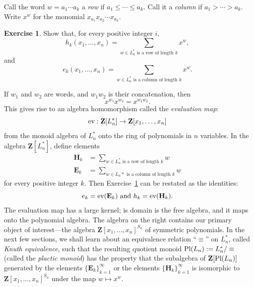 \documentclass[11pt]{amsproc}
\theoremstyle{definition}
\theoremstyle{example}
\newtheorem{exercise}[theorem]{Exercise}
\newcommand{\ev}{\textup{ev}}
\newcommand{\pl}{\textup{Pl}}
\begin{document}
Call the word $w=a_1\dotsb a_k$ a \emph{row} if $a_1\leq \dotsb \leq a_k$.
Call it a \emph{column} if $a_1>\dotsb>a_k$.
Write $x^w$ for the monomial $x_{a_1}x_{a_2}\dotsb x_{a_k}$.
\begin{exercise}
  \label{exercise:row-col}
  Show that, for every positive integer $i$,
  \begin{displaymath}
    h_k(x_1,\dotsc, x_n) = \sum_{\text{$w\in L_n^*$ is a row of length $k$}}x^w,
  \end{displaymath}
  and 
  \begin{displaymath}
    e_k(x_1,\dotsc, x_n) = \sum_{\text{$w\in L_n^*$ is a column of length $k$}}x^w.
  \end{displaymath}
\end{exercise}
If $w_1$ and $w_2$ are words, and $w_1w_2$ is their concatenation, then
\begin{displaymath}
  x^{w_1}x^{w_2} = x^{w_1w_2}.
\end{displaymath}
This gives rise to an algebra homomorphism called the \emph{evaluation map}:
\begin{displaymath}
\ev:\mathbf Z[L_n^*]\to \mathbf Z[x_1,\dotsc, x_n]
\end{displaymath}
from the monoid algebra of $L_n^*$ onto the ring of polynomials in $n$ variables.
In the algebra $\mathbf Z[L_n^*]$, define elements
\begin{align*}
  \mathbf H_k & = \sum_{\text{$w\in L_n^*$ is a row of length $k$}} w\\
  \mathbf E_k & = \sum_{\text{$w\in L_n*$ is a column of length $k$}} w
\end{align*}
for every positive integer $k$.
Then Exercise~\ref{exercise:row-col} can be restated as the identities:
\begin{displaymath}
  e_k = \ev(\mathbf E_k) \text{ and } h_k = \ev(\mathbf H_k).
\end{displaymath}
The evaluation map has a large kernel; is domain is the free algebra, and it maps onto the polynomial algebra.
The algebra on the right contains our primary object of interest---the algebra $\mathbf Z[x_1,\dotsc,x_n]^{S_n}$ of symmetric polynomials.
In the next few sections, we shall learn about an equivalence relation ``$\equiv$'' on $L_n^*$, called \emph{Knuth equivalence}, such that the resulting quotient monoid $\pl(L_n):=L_n^*/\equiv$ (called the \emph{plactic monoid}) has the property that the subalgebra of $\mathbf Z[\pl(L_n)]$ generated by the elements $\{\mathbf E_k\}_{k=1}^\infty$ or the elements $\{\mathbf H_k\}_{k=1}^\infty$ is isomorphic to $\mathbf Z[x_1,\dotsc, x_n]^{S_n}$ under the map $w\mapsto x^w$.
\end{document}
